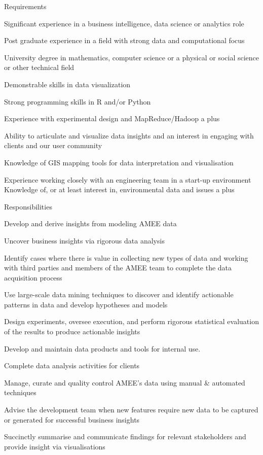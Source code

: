 
Requirements

Significant experience in a business intelligence, data science or analytics role

Post graduate experience in a field with strong data and computational focus

University degree in mathematics, computer science or a physical or social science or other
technical field

Demonstrable skills in data visualization

Strong programming skills in R and/or Python

Experience with experimental design and MapReduce/Hadoop a plus

Ability to articulate and visualize data insights and an interest in engaging with clients and our
user community

Knowledge of GIS mapping tools for data interpretation and visualisation

Experience working closely with an engineering team in a start-up environment Knowledge of, or at
least interest in, environmental data and issues a plus





Responsibilities

Develop and derive insights from modeling AMEE data

Uncover business insights via rigorous data analysis

Identify cases where there is value in collecting new types of data and working with third parties
and members of the AMEE team to complete the data acquisition process

Use large-scale data mining techniques to discover and identify actionable patterns in data and
develop hypotheses and models

Design experiments,  oversee execution, and perform rigorous statistical evaluation of the results
to produce actionable insights

Develop and maintain data products and tools for internal use.

Complete data analysis activities for clients

Manage, curate and quality control AMEE’s data using manual & automated techniques

Advise the development team when new features require new data to be captured or generated for
successful business insights

Succinctly summarise and communicate findings for relevant stakeholders and provide insight via
visualisations




